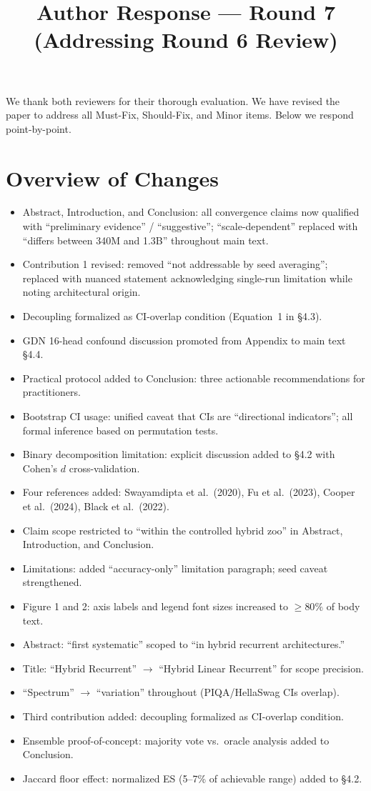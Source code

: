 \documentclass[11pt]{article}
\title{Author Response --- Round 7\\(Addressing Round 6 Review)}
\author{}
\date{}
\begin{document}
\maketitle

We thank both reviewers for their thorough evaluation. We have revised the paper to address all Must-Fix, Should-Fix, and Minor items. Below we respond point-by-point.

\section*{Overview of Changes}

\begin{itemize}[leftmargin=*]
\item Abstract, Introduction, and Conclusion: all convergence claims now qualified with ``preliminary evidence'' / ``suggestive''; ``scale-dependent'' replaced with ``differs between 340M and 1.3B'' throughout main text.
\item Contribution 1 revised: removed ``not addressable by seed averaging''; replaced with nuanced statement acknowledging single-run limitation while noting architectural origin.
\item Decoupling formalized as CI-overlap condition (Equation~1 in \S4.3).
\item GDN 16-head confound discussion promoted from Appendix to main text \S4.4.
\item Practical protocol added to Conclusion: three actionable recommendations for practitioners.
\item Bootstrap CI usage: unified caveat that CIs are ``directional indicators''; all formal inference based on permutation tests.
\item Binary decomposition limitation: explicit discussion added to \S4.2 with Cohen's $d$ cross-validation.
\item Four references added: Swayamdipta et al.\ (2020), Fu et al.\ (2023), Cooper et al.\ (2024), Black et al.\ (2022).
\item Claim scope restricted to ``within the controlled hybrid zoo'' in Abstract, Introduction, and Conclusion.
\item Limitations: added ``accuracy-only'' limitation paragraph; seed caveat strengthened.
\item Figure 1 and 2: axis labels and legend font sizes increased to $\geq 80\%$ of body text.
\item Abstract: ``first systematic'' scoped to ``in hybrid recurrent architectures.''
\item Title: ``Hybrid Recurrent'' $\to$ ``Hybrid Linear Recurrent'' for scope precision.
\item ``Spectrum'' $\to$ ``variation'' throughout (PIQA/HellaSwag CIs overlap).
\item Third contribution added: decoupling formalized as CI-overlap condition.
\item Ensemble proof-of-concept: majority vote vs.\ oracle analysis added to Conclusion.
\item Jaccard floor effect: normalized ES (5--7\% of achievable range) added to \S4.2.
\end{itemize}
\end{document}
